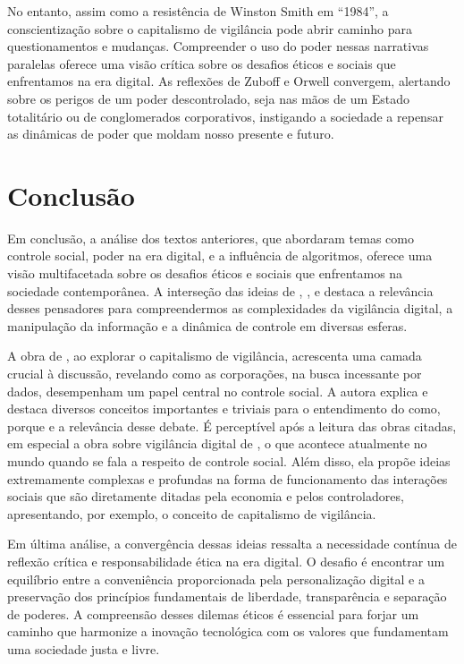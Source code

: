 \documentclass[
	12pt,
	openright,
	twoside,
	a4paper,
	english,
	french,
	spanish,
	brazil
]{abntex2}
\begin{document}
  \newpage

  No entanto, assim como a resistência de Winston Smith em ``1984'', a
  conscientização sobre o capitalismo de vigilância pode abrir caminho para
  questionamentos e mudanças. Compreender o uso do poder nessas narrativas
  paralelas oferece uma visão crítica sobre os desafios éticos e sociais que
  enfrentamos na era digital. As reflexões de Zuboff e Orwell convergem,
  alertando sobre os perigos de um poder descontrolado, seja nas mãos de um
  Estado totalitário ou de conglomerados corporativos, instigando a sociedade a
  repensar as dinâmicas de poder que moldam nosso presente e futuro.

  \chapter{Conclusão}

  Em conclusão, a análise dos textos anteriores, que abordaram temas como
  controle social, poder na era digital, e a influência de algoritmos, oferece
  uma visão multifacetada sobre os desafios éticos e sociais que enfrentamos na
  sociedade contemporânea. A interseção das ideias de
  , ,
   e
   destaca a relevância desses pensadores
  para compreendermos as complexidades da vigilância digital, a manipulação da
  informação e a dinâmica de controle em diversas esferas.

  A obra de , ao explorar o
  capitalismo de vigilância, acrescenta uma camada crucial à discussão,
  revelando como as corporações, na busca incessante por dados, desempenham um
  papel central no controle social. A autora explica e destaca diversos
  conceitos importantes e triviais para o entendimento do como, porque e a
  relevância desse debate. É perceptível após a leitura das obras citadas, em
  especial a obra sobre vigilância digital de
  , o que acontece atualmente no
  mundo quando se fala a respeito de controle social. Além disso, ela propõe
  ideias extremamente complexas e profundas na forma de funcionamento das
  interações sociais que são diretamente ditadas pela economia e pelos
  controladores, apresentando, por exemplo, o conceito de capitalismo de
  vigilância.

  Em última análise, a convergência dessas ideias ressalta a necessidade
  contínua de reflexão crítica e responsabilidade ética na era digital. O
  desafio é encontrar um equilíbrio entre a conveniência proporcionada pela
  personalização digital e a preservação dos princípios fundamentais de
  liberdade, transparência e separação de poderes. A compreensão desses dilemas
  éticos é essencial para forjar um caminho que harmonize a inovação tecnológica
  com os valores que fundamentam uma sociedade justa e livre.

  \postextual

  
\end{document}
